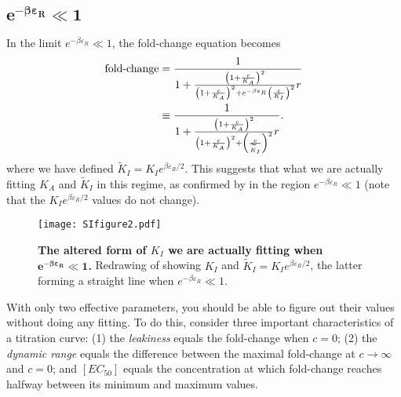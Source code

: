 \subsection{$\boldsymbol{e^{-\beta \varepsilon_R} \ll 1}$}

In the limit $e^{-\beta \varepsilon_R} \ll 1$, the fold-change equation becomes
\begin{align} \label{AppendixSloppinessEq2}
\operatorname{fold-change} &= \frac{1}{1+\frac{\left( 1 + \frac{c}{K_A} \right)^2}{\left( 1 + \frac{c}{K_A} \right)^2 + e^{-\beta \varepsilon_R} \left(\frac{c}{K_I} \right)^2} r} \nonumber\\
&\equiv \frac{1}{1+\frac{\left( 1 + \frac{c}{K_A} \right)^2}{\left( 1 + \frac{c}{K_A} \right)^2 + \left(\frac{c}{\widetilde{K}_I} \right)^2} r}.
\end{align}
where we have defined $\widetilde{K}_I = K_I e^{\beta \varepsilon_R/2}$. This
suggests that what we are actually fitting $K_A$ and $\widetilde{K}_I$ in this
regime, as confirmed by \fref[SIfig2] in the region $e^{-\beta \varepsilon_R} \ll 1$ (note that the $K_I e^{\beta \varepsilon_R/2}$ values do not change).
\begin{figure}[h]
	\centering \texttt{[image: SIfigure2.pdf]} \caption{{\bf The altered
			form of $K_I$ we are actually fitting when $\boldsymbol{e^{-\beta \varepsilon_R}
				\ll 1}$.} Redrawing of \fref[SIfig1] showing $K_I$ and $\widetilde{K}_I
		= K_I e^{\beta \varepsilon_R/2}$, the latter forming a straight line when
		$e^{-\beta \varepsilon_R} \ll 1$.} \label{SIfig2}
\end{figure}

With only two effective parameters, you should be able to figure out their
values without doing any fitting. To do this, consider three important
characteristics of a titration curve: (1) the \textit{leakiness} equals the fold-change
when $c=0$; (2) the \textit{dynamic range} equals the difference between the maximal
fold-change at $c\to\infty$ and $c=0$; and $[EC_{50}]$ equals the concentration at
which fold-change reaches halfway between its minimum and maximum values.

